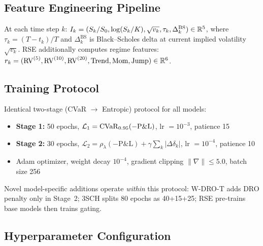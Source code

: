 \subsection{Feature Engineering Pipeline}

At each time step $k$: $I_k = (S_k/S_0, \log(S_k/K), \sqrt{v_k}, \tau_k, \Delta_k^{\mathrm{BS}}) \in \mathbb{R}^5$, where $\tau_k = (T-t_k)/T$ and $\Delta_k^{\mathrm{BS}}$ is Black--Scholes delta at current implied volatility $\sqrt{v_k}$. RSE additionally computes regime features: $r_k = (\mathrm{RV}^{(5)}, \mathrm{RV}^{(10)}, \mathrm{RV}^{(20)}, \mathrm{Trend}, \mathrm{Mom}, \mathrm{Jump}) \in \mathbb{R}^6$.

\subsection{Training Protocol}

Identical two-stage (CVaR $\to$ Entropic) protocol for all models:
\begin{itemize}[noitemsep]
    \item \textbf{Stage 1:} 50 epochs, $\mathcal{L}_1 = \mathrm{CVaR}_{0.95}(-\mathrm{P\&L})$, lr $= 10^{-3}$, patience 15
    \item \textbf{Stage 2:} 30 epochs, $\mathcal{L}_2 = \rho_\lambda(-\mathrm{P\&L}) + \gamma \sum_k |\Delta\delta_k|$, lr $= 10^{-4}$, patience 10
    \item Adam optimizer, weight decay $10^{-4}$, gradient clipping $\|\nabla\| \leq 5.0$, batch size 256
\end{itemize}

Novel model-specific additions operate \emph{within} this protocol: W-DRO-T adds DRO penalty only in Stage~2; 3SCH splits 80 epochs as 40+15+25; RSE pre-trains base models then trains gating.

\subsection{Hyperparameter Configuration}

